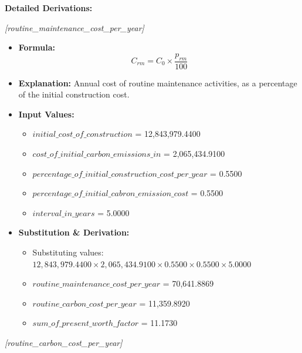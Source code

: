 \documentclass[12pt,a4paper]{article}
\begin{document}
\textbf{Detailed Derivations:}


\textit{[routine\_maintenance\_cost\_per\_year]}

\begin{itemize}
  \item \textbf{Formula:} $$C_{rm} = C_0 \times \frac{p_{rm}}{100}$$
  \item \textbf{Explanation:} Annual cost of routine maintenance activities, as a percentage of the initial construction cost.
  \item \textbf{Input Values:}
  \begin{itemize}
    \item $initial\_cost\_of\_construction$ = 12,843,979.4400
    \item $cost\_of\_initial\_carbon\_emissions\_in$ = 2,065,434.9100
    \item $percentage\_of\_initial\_construction\_cost\_per\_year$ = 0.5500
    \item $percentage\_of\_initial\_cabron\_emission\_cost$ = 0.5500
    \item $interval\_in\_years$ = 5.0000
  \end{itemize}
  \item \textbf{Substitution \& Derivation:}
  \begin{itemize}
    \item Substituting values: $12,843,979.4400 \times 2,065,434.9100 \times 0.5500 \times 0.5500 \times 5.0000$
    \item $routine\_maintenance\_cost\_per\_year$ = 70,641.8869
    \item $routine\_carbon\_cost\_per\_year$ = 11,359.8920
    \item $sum\_of\_present\_worth\_factor$ = 11.1730
  \end{itemize}
\end{itemize}


\textit{[routine\_carbon\_cost\_per\_year]}
\end{document}
